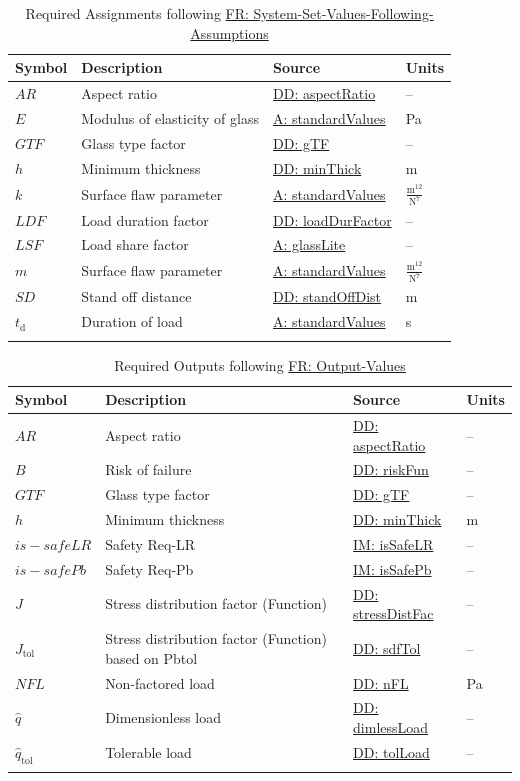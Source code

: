 \documentclass[12pt]{article}
\begin{document}
\begin{longtable}{l l l l}
\toprule
\textbf{Symbol} & \textbf{Description} & \textbf{Source} & \textbf{Units}
\\
\midrule
\endhead
$AR$ & Aspect ratio & \hyperref[DD:aspectRatio]{DD: aspectRatio} & --
\\
$E$ & Modulus of elasticity of glass & \hyperref[assumpSV]{A: standardValues} & Pa
\\
$GTF$ & Glass type factor & \hyperref[DD:gTF]{DD: gTF} & --
\\
$h$ & Minimum thickness & \hyperref[DD:minThick]{DD: minThick} & m
\\
$k$ & Surface flaw parameter & \hyperref[assumpSV]{A: standardValues} & $\frac{\text{m}^{12}}{\text{N}^{7}}$
\\
$LDF$ & Load duration factor & \hyperref[DD:loadDurFactor]{DD: loadDurFactor} & --
\\
$LSF$ & Load share factor & \hyperref[assumpGL]{A: glassLite} & --
\\
$m$ & Surface flaw parameter & \hyperref[assumpSV]{A: standardValues} & $\frac{\text{m}^{12}}{\text{N}^{7}}$
\\
$SD$ & Stand off distance & \hyperref[DD:standOffDist]{DD: standOffDist} & m
\\
${t_{\text{d}}}$ & Duration of load & \hyperref[assumpSV]{A: standardValues} & s
\\
\bottomrule
\caption{Required Assignments following \hyperref[sysSetValsFollowingAssumps]{FR: System-Set-Values-Following-Assumptions}}
\label{Table:ReqAssignments}
\end{longtable}
\begin{longtabu}{l X[l] l l}
\toprule
\textbf{Symbol} & \textbf{Description} & \textbf{Source} & \textbf{Units}
\\
\midrule
\endhead
$AR$ & Aspect ratio & \hyperref[DD:aspectRatio]{DD: aspectRatio} & --
\\
$B$ & Risk of failure & \hyperref[DD:riskFun]{DD: riskFun} & --
\\
$GTF$ & Glass type factor & \hyperref[DD:gTF]{DD: gTF} & --
\\
$h$ & Minimum thickness & \hyperref[DD:minThick]{DD: minThick} & m
\\
$is-safeLR$ & Safety Req-LR & \hyperref[IM:isSafeLR]{IM: isSafeLR} & --
\\
$is-safePb$ & Safety Req-Pb & \hyperref[IM:isSafePb]{IM: isSafePb} & --
\\
$J$ & Stress distribution factor (Function) & \hyperref[DD:stressDistFac]{DD: stressDistFac} & --
\\
${J_{\text{tol}}}$ & Stress distribution factor (Function) based on Pbtol & \hyperref[DD:sdfTol]{DD: sdfTol} & --
\\
$NFL$ & Non-factored load & \hyperref[DD:nFL]{DD: nFL} & Pa
\\
$\hat{q}$ & Dimensionless load & \hyperref[DD:dimlessLoad]{DD: dimlessLoad} & --
\\
${\hat{q}_{\text{tol}}}$ & Tolerable load & \hyperref[DD:tolLoad]{DD: tolLoad} & --
\\
\bottomrule
\caption{Required Outputs following \hyperref[outputValues]{FR: Output-Values}}
\label{Table:ReqOutputs}
\end{longtabu}
\end{document}
